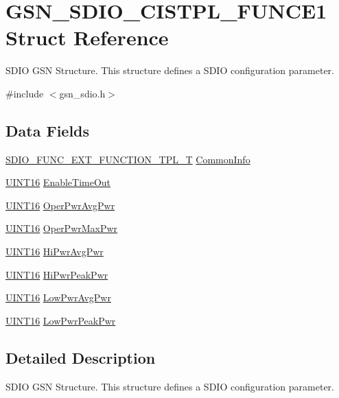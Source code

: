 \hypertarget{a00220}{
\section{GSN\_\-SDIO\_\-CISTPL\_\-FUNCE1 Struct Reference}
\label{a00220}
}


SDIO GSN Structure. This structure defines a SDIO configuration parameter.  




{\ttfamily \#include $<$gsn\_\-sdio.h$>$}

\subsection*{Data Fields}
\begin{DoxyCompactItemize}
\item 
\hyperlink{a00458}{SDIO\_\-FUNC\_\-EXT\_\-FUNCTION\_\-TPL\_\-T} \hyperlink{a00220_add1e98df141f0aecee01016e6471983b}{CommonInfo}
\item 
\hyperlink{a00660_ga09f1a1fb2293e33483cc8d44aefb1eb1}{UINT16} \hyperlink{a00220_aff67221faaecbc9832dd160acf8e188e}{EnableTimeOut}
\item 
\hyperlink{a00660_ga09f1a1fb2293e33483cc8d44aefb1eb1}{UINT16} \hyperlink{a00220_ae980eb82bd747d9f5bd9ab3ee5443fe2}{OperPwrAvgPwr}
\item 
\hyperlink{a00660_ga09f1a1fb2293e33483cc8d44aefb1eb1}{UINT16} \hyperlink{a00220_a48d11a792eedf73d120155f01b711001}{OperPwrMaxPwr}
\item 
\hyperlink{a00660_ga09f1a1fb2293e33483cc8d44aefb1eb1}{UINT16} \hyperlink{a00220_a7e3e11d35a811be9b7a61f99e22bed1c}{HiPwrAvgPwr}
\item 
\hyperlink{a00660_ga09f1a1fb2293e33483cc8d44aefb1eb1}{UINT16} \hyperlink{a00220_a8d72d6e4ca4f592d5cd3d8060a108dab}{HiPwrPeakPwr}
\item 
\hyperlink{a00660_ga09f1a1fb2293e33483cc8d44aefb1eb1}{UINT16} \hyperlink{a00220_a2a1f8d07d2dc4f981316502babdf63eb}{LowPwrAvgPwr}
\item 
\hyperlink{a00660_ga09f1a1fb2293e33483cc8d44aefb1eb1}{UINT16} \hyperlink{a00220_ae73fd7ca1d2e5ecb148af4e60a8846b8}{LowPwrPeakPwr}
\end{DoxyCompactItemize}


\subsection{Detailed Description}
SDIO GSN Structure. This structure defines a SDIO configuration parameter. 

